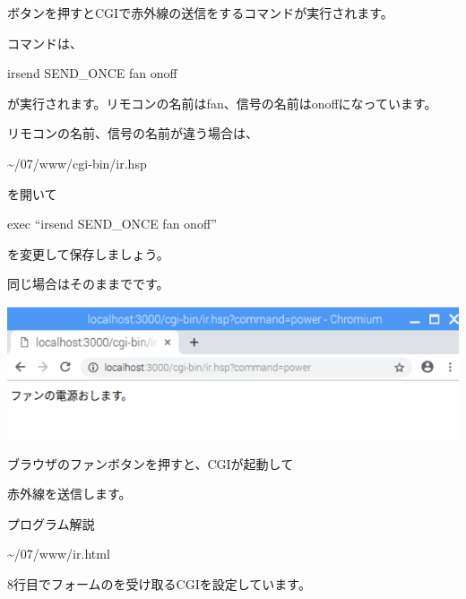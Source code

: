 \documentclass[a4paper,12pt,dvipdfmx]{jarticle}
\begin{document}
ボタンを押すとCGIで赤外線の送信をするコマンドが実行されます。

コマンドは、

irsend SEND\_ONCE fan onoff

が実行されます。リモコンの名前はfan、信号の名前はonoffになっています。

リモコンの名前、信号の名前が違う場合は、

{\textasciitilde}/07/www/cgi-bin/ir.hsp

を開いて

exec “irsend SEND\_ONCE fan onoff”

を変更して保存しましょう。

同じ場合はそのままでです。

%


\centering
\includegraphics[width=16.671cm]{ome7-img062.png}
\flushleft

ブラウザのファンボタンを押すと、CGIが起動して

赤外線を送信します。


\bigskip

\clearpage
プログラム解説

{\textasciitilde}/07/www/ir.html

8行目でフォームのを受け取るCGIを設定しています。
\end{document}
